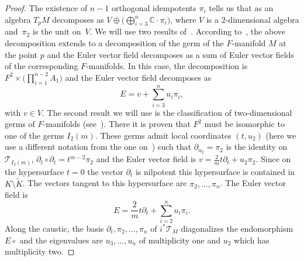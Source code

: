 \documentclass[pdftex]{sigma}
\numberwithin{equation}{section}
\begin{document}
\begin{proof}
 The existence of $n-1$ orthogonal idempotents $\pi_{i}$ tells us that as an algebra $T_{p}M$ decomposes as $V\oplus\bigl(\bigoplus_{i=3}^{n}\mathbb{C}\cdot\pi_{i}\bigr)$, where $V$ is a $2$-dimensional algebra and~$\pi_{2}$ is the unit on~$V$. We will use two results of~\cite{HertlingFrobenius}. According to~\cite[Theorem~2.11]{HertlingFrobenius}, the above decomposition extends to a decomposition of the germ of the $F$-manifold $M$ at the point $p$ and the Euler vector field decomposes as a sum of Euler vector fields of the corresponding $F$-manifolds. In this case, the decomposition is $F^{2}\times\bigl(\prod_{i=1}^{n-2}A_{1}\bigr) $ and the Euler vector field decomposes as
 \begin{equation*}
 E= v+\sum_{i=3}^{n}u_{i}\pi_{i},
 \end{equation*}
 with $v\in V$. The second result we will use is the classification of two-dimensional germs of $F$-manifolds (see~\cite[Example~2.12\,(iv) and Theorem~4.7\,(a)]{HertlingFrobenius}).
 There it is proven that $F^{2}$ must be isomorphic to one of the germs $I_{2}(m)$. These germs admit local coordinates $(t,u_{2})$ (here we use a different notation from the one on~\cite{HertlingFrobenius}) such that $\partial_{u_{2}}=\pi_{2}$ is the identity on $\mathcal{T}_{I_{2}(m)}$, $\partial_{t}\circ\partial_{t}=t^{m-2}\pi_{2}$ and the Euler vector field is $v=\tfrac{2}{m}t\partial_{t}+u_{2}\pi_{2}$. Since on the hypersurface $t=0$ the vector $\partial_{t}$ is nilpotent this hypersurface is contained in $K\setminus\tilde{K}$. The vectors tangent to this hypersurface are $\pi_{2},\dots,\pi_{n}$. The Euler vector field is
 \begin{equation*}
 E=\frac{2}{m}t\partial_{t}+\sum_{i=2}^{n}u_{i}\pi_{i}.
 \end{equation*}
 Along the caustic, the basis $\partial_{t},\pi_{2},\dots,\pi_{n}$ of $i^{*}\mathcal{T}_{M}$ diagonalizes the endomorphism $E\circ$ and the eigenvalues are $u_{3},\dots,u_{n}$ of multiplicity one and $u_{2}$ which has multiplicity two.
\end{proof}
\end{document}
